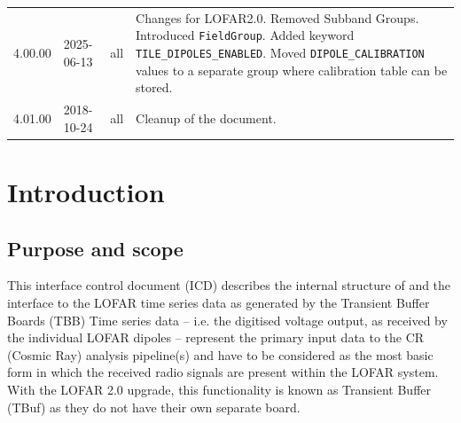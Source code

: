 \documentclass[a4paper,10pt,bibtotoc]{scrartcl}
\begin{document}
\begin{center}
  \tablelasttail{\hline}
  \begin{supertabular}{lllp{9.5cm}}
    4.00.00 & 2025-06-13 & all   & Changes for LOFAR2.0. Removed Subband Groups. Introduced \texttt{FieldGroup}. Added keyword \texttt{TILE\_DIPOLES\_ENABLED}. Moved \texttt{DIPOLE\_CALIBRATION} values to a separate group where calibration table can be stored. \\
    4.01.00 & 2018-10-24 & all   & Cleanup of the document. \\
 \end{supertabular}
\end{center}








\clearpage


\section{Introduction}
\label{sec:introduction}

\subsection{Purpose and scope}
\label{sec:purpose and scope}

This interface control document (ICD) describes the internal structure
of and the interface to the LOFAR time series data as generated by the Transient Buffer Boards (TBB) 
 Time series data -- i.e. the digitised voltage output, as received by the individual
LOFAR dipoles -- represent the primary input data to the CR (Cosmic
Ray) analysis pipeline(s) and have to be considered as the most basic
form in which the received radio signals are present within the LOFAR
system. With the LOFAR 2.0 upgrade, this functionality is known as Transient Buffer (TBuf) 
as they do not have their own separate board.
\end{document}
